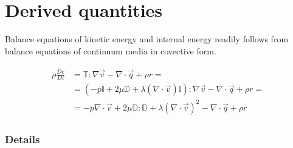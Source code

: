\documentclass[letterpaper,10pt,english]{jupyterBook}
\begin{document}
\section{Derived quantities}
\label{\detokenize{ch/fluids/governing-equations:derived-quantities}}
\sphinxAtStartPar
Balance equations of kinetic energy and internal energy readily follows from balance equations of continuum media in covective form.



\sphinxAtStartPar
{}

\sphinxAtStartPar
{}
\begin{equation*}
\begin{split}\begin{aligned}
 \rho \frac{D e}{D t}
  & = \mathbb{T} : \nabla \vec{v} - \nabla \cdot \vec{q} + \rho r  = \\
  & = \left( -p \mathbb{I} + 2 \mu \mathbb{D} + \lambda (\nabla \cdot \vec{v}) \mathbb{I} \right) : \nabla \vec{v} - \nabla \cdot \vec{q} + \rho r  = \\
  & = - p \nabla \cdot \vec{v} + 2 \mu \mathbb{D} : \mathbb{D} + \lambda (\nabla \cdot \vec{v})^2 - \nabla \cdot \vec{q} + \rho r
\end{aligned}\end{split}
\end{equation*}\subsubsection*{Details}

\sphinxAtStartPar
{}
\end{document}
